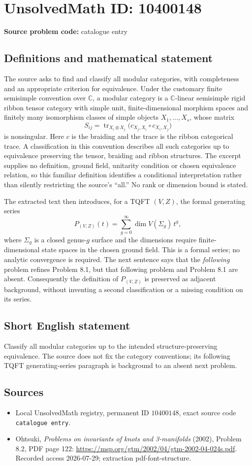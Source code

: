 \documentclass[11pt]{article}
\newcommand{\C}{\mathbb{C}}
\begin{document}
\section*{UnsolvedMath ID: 10400148}
\textbf{Source problem code:} catalogue entry
\subsection{Definitions and mathematical statement}
The source asks to find and classify all modular categories, with completeness and an appropriate criterion for equivalence. Under the customary finite semisimple convention over \(\C\), a modular category is a \(\C\)-linear semisimple rigid ribbon tensor category with simple unit, finite-dimensional morphism spaces and finitely many isomorphism classes of simple objects \(X_1,\ldots,X_s\), whose matrix
\[S_{ij}=\operatorname{tr}_{X_i\otimes X_j}\bigl(c_{X_j,X_i}\circ c_{X_i,X_j}\bigr)\]
is nonsingular. Here \(c\) is the braiding and the trace is the ribbon categorical trace. A classification in this convention describes all such categories up to equivalence preserving the tensor, braiding and ribbon structures. The excerpt supplies no definition, ground field, unitarity condition or chosen equivalence relation, so this familiar definition identifies a conditional interpretation rather than silently restricting the source's ``all.'' No rank or dimension bound is stated.

The extracted text then introduces, for a TQFT \((V,Z)\), the formal generating series
\[P_{(V,Z)}(t)=\sum_{g=0}^{\infty}\dim V(\Sigma_g)\,t^g,\]
where \(\Sigma_g\) is a closed genus-\(g\) surface and the dimensions require finite-dimensional state spaces in the chosen ground field. This is a formal series; no analytic convergence is required. The next sentence says that the \emph{following} problem refines Problem 8.1, but that following problem and Problem 8.1 are absent. Consequently the definition of \(P_{(V,Z)}\) is preserved as adjacent background, without inventing a second classification or a missing condition on its series.
\subsection{Short English statement}
Classify all modular categories up to the intended structure-preserving equivalence. The source does not fix the category conventions; its following TQFT generating-series paragraph is background to an absent next problem.
\subsection{Sources}
\begin{itemize}
\item Local UnsolvedMath registry, permanent ID \(10400148\), exact source code \texttt{catalogue entry}.
\item Ohtsuki, \emph{Problems on invariants of knots and 3-manifolds} (2002), Problem 8.2, PDF page 122: \url{https://msp.org/gtm/2002/04/gtm-2002-04-024s.pdf}. Recorded access 2026-07-29; extraction pdf-font-structure.
\end{itemize}
\end{document}
